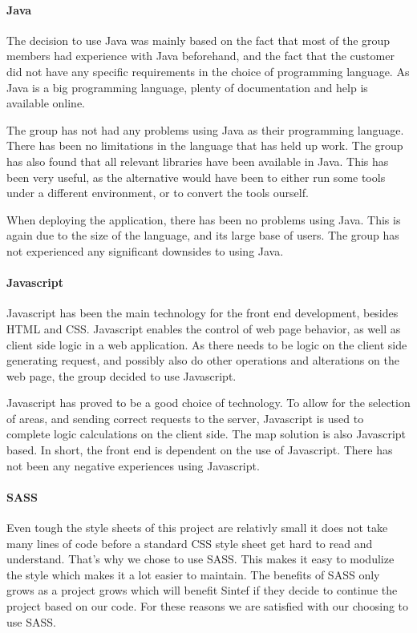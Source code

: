 \documentclass[11pt,a4paper,titlepage,oneside]{report}
\begin{document}
\paragraph{Java}
The decision to use Java was mainly based on the fact that most of the group members had experience with Java beforehand, and the fact that the customer did not have any specific requirements in the choice of programming language. As Java is a big programming language, plenty of documentation and help is available online. 

The group has not had any problems using Java as their programming language. There has been no limitations in the language that has held up work. The group has also found that all relevant libraries have been available in Java. This has been very useful, as the alternative would have been to either run some tools under a different environment, or to convert the tools ourself. 

When deploying the application, there has been no problems using Java. This is again due to the size of the language, and its large base of users. The group has not experienced any significant downsides to using Java. 

\paragraph{Javascript}
Javascript has been the main technology for the front end development, besides \gls{HTML} and \gls{CSS}. Javascript enables the control of web page behavior, as well as client side logic in a web application. As there needs to be logic on the client side generating request, and possibly also do other operations and alterations on the web page, the group decided to use Javascript. 

Javascript has proved to be a good choice of technology. To allow for the selection of areas, and sending correct requests to the server, Javascript is used to complete logic calculations on the client side. The map solution is also Javascript based. In short, the front end is dependent on the use of Javascript. There has not been any negative experiences using Javascript. 

\paragraph{SASS}
Even tough the style sheets of this project are relativly small it does not take many lines of code before a standard \gls{CSS} style sheet get hard to read and understand. That's why we chose to use \gls{SASS}. This makes it easy to modulize the style which makes it a lot easier to maintain. The benefits of \gls{SASS} only grows as a project grows which will benefit Sintef if they decide to continue the project based on our code. For these reasons we are satisfied with our choosing to use \gls{SASS}.
\end{document}
